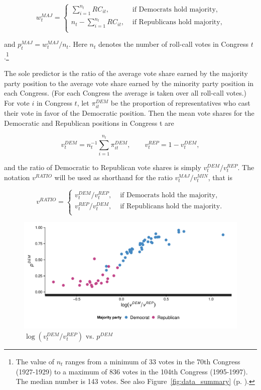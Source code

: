 \begin{equation*}
w_t^{MAJ} =
\begin{cases} \sum_{i=1}^{n_t} RC_{it}, & \text{ if Democrats hold majority}, \\[10pt]
n_t - \sum_{i=1}^{n_t} RC_{it}, & \text{ if Republicans hold majority,} \\
\end{cases}
\end{equation*}
 
\noindent and $p_t^{MAJ} = w_t^{MAJ} / n_t$. Here $n_t$ denotes the number of roll-call votes in Congress $t$.\footnote{The value of $n_t$ ranges from a minimum of 33 votes in the 70th Congress (1927-1929) to a maximum of 836 votes in the 104th Congress (1995-1997). The median number is 143 votes. See also Figure~\ref{fig:data_summary} (p. \pageref{fig:data_summary}).} 

The sole predictor is the ratio of the average vote share earned by the majority party position to the average vote share earned by the minority party position in each Congress.  (For each Congress the average is taken over all roll-call votes.)  For vote $i$ in Congress $t$, let $\pi_{it}^{DEM}$ be the proportion of representatives who cast their vote in favor of the Democratic position.  Then the mean vote shares for the Democratic and Republican positions in Congress t are

\begin{equation*}
v_t^{DEM} = n_t^{-1} \sum_{i=1}^{n_t} \pi_{it}^{DEM}, \qquad v_t^{REP} = 1 - v_t^{DEM},
\end{equation*}

\noindent and the ratio of Democratic to Republican vote shares is simply $v_t^{DEM} / v_t^{REP}$. The notation $v^{RATIO}$ will be used as shorthand for the ratio $v_t^{MAJ} / v_t^{MIN}$, that is 

\begin{equation*}
v^{RATIO} = 
\begin{cases} 
v_t^{DEM} / v_t^{REP}, & \text{ if Democrats hold the majority,} \\[10pt]
v_t^{REP} / v_t^{DEM}, & \text{ if Republicans hold the majority.} \\
\end{cases}
\end{equation*}


\begin{figure}
\centering
	\includegraphics[scale=0.75]{sections/figs/logvratio_vs_pdem}
\caption{$\log{(v_t^{DEM} / v_t^{REP} )}$  vs. $p^{DEM}$}
\label{fig:log_vratio_vs_ptdem}
\end{figure}

